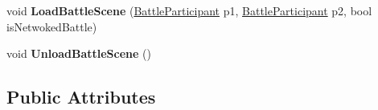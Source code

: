 \begin{DoxyCompactItemize}
\item 
\hypertarget{class_game_manager_a9d3b6a3fb49a9402e1afde9224a12e21}{void {\bfseries Load\-Battle\-Scene} (\hyperlink{class_battle_participant}{Battle\-Participant} p1, \hyperlink{class_battle_participant}{Battle\-Participant} p2, bool is\-Netwoked\-Battle)}\label{class_game_manager_a9d3b6a3fb49a9402e1afde9224a12e21}

\item 
\hypertarget{class_game_manager_a4b49768a7f34b0f3795741f997eca643}{void {\bfseries Unload\-Battle\-Scene} ()}\label{class_game_manager_a4b49768a7f34b0f3795741f997eca643}

\end{DoxyCompactItemize}
\subsection*{Public Attributes}

